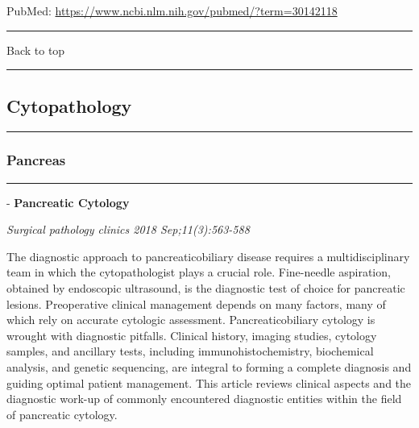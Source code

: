 \documentclass[]{article}
\begin{document}
PubMed: \url{https://www.ncbi.nlm.nih.gov/pubmed/?term=30142118}

{}

{}

\begin{center}\rule{0.5\linewidth}{\linethickness}\end{center}

Back to top

\begin{center}\rule{0.5\linewidth}{\linethickness}\end{center}

\pagebreak

\hypertarget{cytopathology}{%
\subsection{Cytopathology}\label{cytopathology}}

\begin{center}\rule{0.5\linewidth}{\linethickness}\end{center}

\hypertarget{pancreas-1}{%
\subsubsection{Pancreas}\label{pancreas-1}}

\begin{center}\rule{0.5\linewidth}{\linethickness}\end{center}

 - \textbf{Pancreatic Cytology}

\emph{Surgical pathology clinics 2018 Sep;11(3):563-588}

The diagnostic approach to pancreaticobiliary disease requires a
multidisciplinary team in which the cytopathologist plays a crucial
role. Fine-needle aspiration, obtained by endoscopic ultrasound, is the
diagnostic test of choice for pancreatic lesions. Preoperative clinical
management depends on many factors, many of which rely on accurate
cytologic assessment. Pancreaticobiliary cytology is wrought with
diagnostic pitfalls. Clinical history, imaging studies, cytology
samples, and ancillary tests, including immunohistochemistry,
biochemical analysis, and genetic sequencing, are integral to forming a
complete diagnosis and guiding optimal patient management. This article
reviews clinical aspects and the diagnostic work-up of commonly
encountered diagnostic entities within the field of pancreatic cytology.
\end{document}
